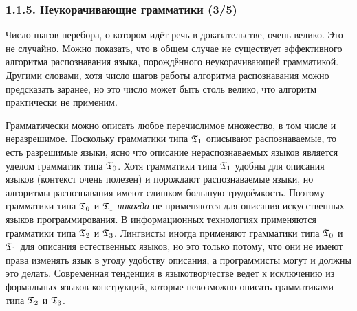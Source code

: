\begin{frame}
\frametitle{1.1.5. Неукорачивающие грамматики (3/5)}
\begin{remark}
Число шагов перебора,
о котором идёт речь в доказательстве,
очень велико.
Это не случайно.
Можно показать, что в общем случае не существует эффективного
алгоритма распознавания языка, порождённого неукорачивающей
грамматикой. Другими словами, хотя число шагов работы алгоритма
распознавания можно предсказать заранее, но это число
может быть столь велико, что алгоритм практически не применим.
\end{remark}


\begin{digress}
Грамматически можно
описать любое перечислимое множество, в том числе и неразрешимое.
Поскольку грамматики типа $\frak{T}_1$ описывают распознаваемые, то есть
разрешимые языки, ясно что описание нераспознаваемых языков
является уделом грамматик типа $\frak{T}_0$. Хотя грамматики типа $\frak{T}_1$
удобны для описания языков (контекст очень полезен)
и порождают распознаваемые языки,
но алгоритмы распознавания имеют слишком
большую трудоёмкость. Поэтому грамматики
типа $\frak{T}_0$ и $\frak{T}_1$ {\em никогда} не применяются для описания
искусственных языков программирования.
В информационных технологиях
применяются грамматики типа $\frak{T}_2$ и $\frak{T}_3$.
Лингвисты иногда применяют грамматики
типа $\frak{T}_0$ и $\frak{T}_1$ для описания естественных языков,
но это только потому, что они не имеют права
изменять язык в угоду удобству описания,
а программисты могут и должны это делать.
Современная тенденция в языкотворчестве
ведет к исключению из формальных языков конструкций,
которые невозможно описать грамматиками типа $\frak{T}_2$ и $\frak{T}_3$.
\end{digress}

\end{frame}

